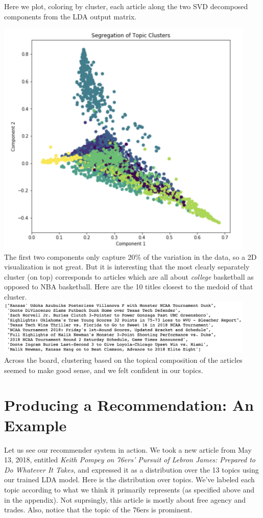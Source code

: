 \documentclass[11pt]{article}
\begin{document}
Here we plot, coloring by cluster, each article along the two SVD decomposed components from the LDA output matrix. 

\includegraphics[width=350pt]{svd_clusters.png} \\

The first two components only capture 20\% of the variation in the data, so a 2D visualization is not great.  But it is interesting that the most clearly separately cluster (on top) corresponds to articles which are all about \textit{college} basketball as opposed to NBA basketball. Here are the 10 titles closest to the medoid of that cluster. \\

\includegraphics[width=350pt]{college_medoid_closest10.png} \\

Across the board, clustering based on the topical composition of the articles seemed to make good sense, and we felt confident in our topics. 

\section{Producing a Recommendation: An Example}
Let us see our recommender system in action.  We took a new article from May 13, 2018, entitled \textit{Keith Pompey on 76ers' Pursuit of Lebron James: Prepared to Do Whatever It Takes}, and expressed it as a distribution over the 13 topics using our trained LDA model.  Here is the distribution over topics.  We've labeled each topic according to what we think it primarily represents (as specified above and in the appendix). Not suprsingly, this article is mostly about free agency and trades. Also, notice that the topic of the 76ers is prominent. 
\end{document}
